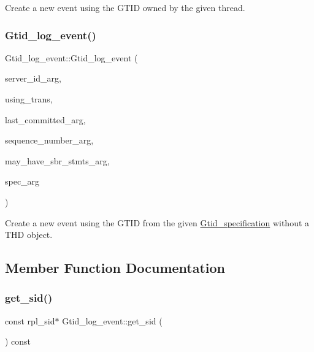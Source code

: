 Create a new event using the G\+T\+ID owned by the given thread. \mbox{\label{classGtid__log__event_ab403082853928b5d966f92a1390852f5}} 
\subsubsection{\texorpdfstring{Gtid\+\_\+log\+\_\+event()}{Gtid\_log\_event()}\hspace{0.1cm}{\footnotesize\ttfamily [2/2]}}
{\footnotesize\ttfamily Gtid\+\_\+log\+\_\+event\+::\+Gtid\+\_\+log\+\_\+event (\begin{DoxyParamCaption}\item[{uint32}]{server\+\_\+id\+\_\+arg,  }\item[{bool}]{using\+\_\+trans,  }\item[{int64}]{last\+\_\+committed\+\_\+arg,  }\item[{int64}]{sequence\+\_\+number\+\_\+arg,  }\item[{bool}]{may\+\_\+have\+\_\+sbr\+\_\+stmts\+\_\+arg,  }\item[{const \mbox{\hyperlink{structGtid__specification}{Gtid\+\_\+specification}}}]{spec\+\_\+arg }\end{DoxyParamCaption})}

Create a new event using the G\+T\+ID from the given \mbox{\hyperlink{structGtid__specification}{Gtid\+\_\+specification}} without a T\+HD object. 

\subsection{Member Function Documentation}
\mbox{\label{classGtid__log__event_a8bd269465a18073057041ecbd7253127}} 
\subsubsection{\texorpdfstring{get\+\_\+sid()}{get\_sid()}}
{\footnotesize\ttfamily const rpl\+\_\+sid$\ast$ Gtid\+\_\+log\+\_\+event\+::get\+\_\+sid (\begin{DoxyParamCaption}{ }\end{DoxyParamCaption}) const\hspace{0.3cm}{\ttfamily [inline]}}

